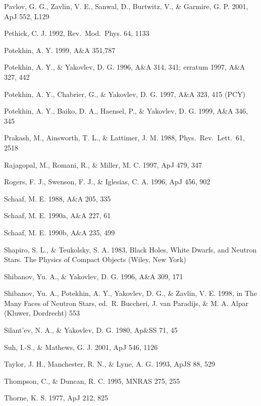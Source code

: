 \documentclass{aa}
\begin{document}
\begin{thebibliography}{}
Pavlov, G. G., Zavlin, V. E., Sanwal, D., 
              Burtwitz, V., \& Garmire, G. P.
2001, ApJ 552, L129

Pethick, C. J. 1992,
Rev.\ Mod.\ Phys. 64, 1133

Potekhin, A. Y. 1999,
A\&A 351,787

Potekhin, A. Y., \& Yakovlev, D. G. 1996, A\&A 314, 341; 
erratum 1997, A\&A 327, 442

   Potekhin, A. Y., Chabrier, G., \& Yakovlev, D. G. 1997, A\&A 
   323, 415 (PCY)

Potekhin, A. Y., Baiko, D. A., Haensel, P., \& Yakovlev, D. G. 1999,
A\&A 346, 345
 
Prakash, M., Ainsworth, T. L., \& Lattimer, J. M. 1988, 
Phys.\ Rev.\ Lett.\ 61, 2518

Rajagopal, M., Romani, R., \& Miller, M. C. 1997,
ApJ 479, 347

Rogers, F. J., Swenson, F. J., \& Iglesias, C. A. 1996, ApJ 456, 902

Schaaf, M. E. 1988, A\&A 205, 335

Schaaf, M. E. 1990a, A\&A 227, 61

Schaaf, M. E. 1990b, A\&A 235, 499

Shapiro, S. L., \& Teukolsky, S. A. 1983,
Black Holes, White Dwarfs, and Neutron Stars. 
The Physics of Compact Objects (Wiley, New York)

Shibanov, Yu. A., \& Yakovlev, D. G. 1996,
A\&A 309, 171

Shibanov, Yu. A., Potekhin, A. Y., Yakovlev, D. G., \& Zavlin, V. E. 1998,
in 
The Many Faces of Neutron Stars, 
ed.\ R. Buccheri, J. van Paradijs, \& M. A. Alpar
(Kluwer, Dordrecht) 553

Silant'ev, N. A., \& Yakovlev, D. G. 1980,
Ap\&SS 71, 45

Suh, I.-S., \& Mathews, G. J. 2001,
ApJ 546, 1126

Taylor, J. H., Manchester, R. N., \& Lyne, A. G. 1993, ApJS 88, 529

Thompson, C., \& Duncan, R. C. 1995, MNRAS 275, 255

Thorne, K. S. 1977, ApJ 212, 825


\end{thebibliography}
\end{document}
